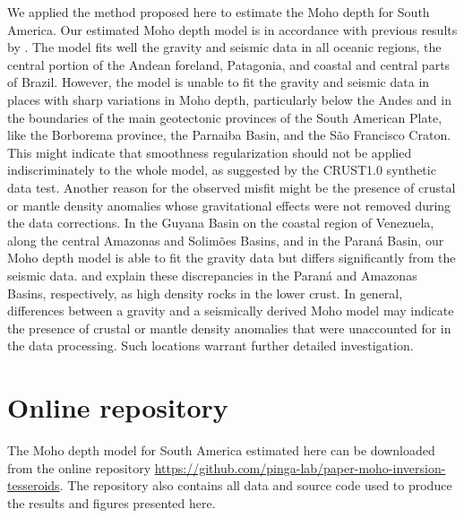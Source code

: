 We applied the method proposed here to estimate the Moho depth for South
America.
Our estimated Moho depth model is in accordance with previous results by
\citet{vandermeijde2013}.
The model fits well the gravity and seismic data in all oceanic regions, the
central portion of the Andean foreland, Patagonia, and coastal and central
parts of Brazil.
However, the model is unable to fit the gravity and seismic data in places with
sharp variations in Moho depth, particularly below the Andes and in the
boundaries of the main geotectonic provinces of the South American Plate, like
the Borborema province, the Parnaiba Basin, and the São Francisco Craton.
This might indicate that smoothness regularization should not be applied
indiscriminately to the whole model, as suggested by the CRUST1.0 synthetic
data test.
Another reason for the observed misfit might be the presence of crustal or
mantle density anomalies whose gravitational effects were not removed during
the data corrections.
In the Guyana Basin on the coastal region of Venezuela, along the central
Amazonas and Solimões Basins, and in the Paraná Basin, our Moho depth model is
able to fit the gravity data but differs significantly from the seismic data.
\citet{mariani2013} and \citet{nunn1988} explain these discrepancies in the
Paraná and Amazonas Basins, respectively, as high density rocks in the lower
crust.
In general, differences between a gravity and a seismically derived Moho model
may indicate the presence of crustal or mantle density anomalies that were
unaccounted for in the data processing.
Such locations warrant further detailed investigation.


\section{Online repository}

The Moho depth model for South America estimated here can be downloaded from
the online repository
\url{https://github.com/pinga-lab/paper-moho-inversion-tesseroids}.
The repository also contains all data and source code used to produce the
results and figures presented here.
